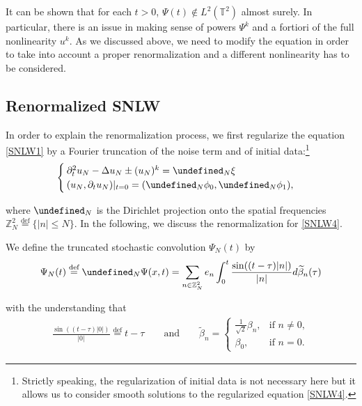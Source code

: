 \documentclass[letterpaper, 11pt,  reqno]{amsart}
\newcommand{\1}{\hspace{0.5mm}\text{I}\hspace{0.5mm}}
\newcommand{\noi}{\noindent}
\newcommand{\Z}{\mathbb{Z}}
\newcommand{\T}{\mathbb{T}}
\let\P= \undefined
\newcommand{\P}{\mathbf{P}}
\newcommand{\be}{\beta}
\newcommand{\Dl}{\Delta}
\newcommand{\wt}{\widetilde}
\newcommand{\dt}{\partial_t}
\numberwithin{equation}{section}
\numberwithin{theorem}{section}
\begin{document}
\noi
It can be shown that for each $t> 0$, $\Psi (t)\notin L^2(\T^2)$ almost surely.
In particular, there is an issue in making sense of powers
$\Psi^k$ and a fortiori of the full nonlinearity $u^k$. 
As we discussed above, 
we need to modify  the equation in order to take into account a proper renormalization and a different nonlinearity has to be considered. 




\subsection{Renormalized SNLW}
In order to explain the renormalization process,
 we first regularize the equation \eqref{SNLW1} by a Fourier truncation of the noise term and of initial data:\footnote{Strictly speaking, the regularization of initial data is not necessary here but it allows
 us to consider smooth solutions to the regularized equation \eqref{SNLW4}.}
\begin{align}
\begin{cases}
\dt^2 u_N -  \Dl  u_N   \pm  ( u_N)^k   = \P_N \xi \\ 
(u_N, \dt u_N) |_{t = 0} = (\P_N\phi_0, \P_N\phi_1),
\end{cases}
\label{SNLW4}
\end{align}


\noi
where  $\P_N$ is the Dirichlet projection onto the spatial frequencies $\Z^2_N \stackrel{\text{def}}{=} \{|n|\leq N\}$.
In the following, we discuss the renormalization for   \eqref{SNLW4}.

We define 
 the truncated stochastic convolution $\Psi_N(t)$ by 
\begin{align} 
\Psi_N(t) \stackrel{\text{def}}{=}  \P_N \Psi(x, t)
 = \sum_{n \in \mathbb{Z}^2_N} e_n 
   \int_0^t \frac{\sin ((t - \tau) | n |)}{| n |} d \wt \beta_n (\tau) 
\label{G0}
\end{align}   


\noi
with the understanding that
\begin{align}
\frac{\sin ((t - \tau) | 0 |)}{| 0 |} \stackrel{\text{def}}{=} t-\tau
\qquad \text{and}\qquad
 \wt \be_n = \begin{cases}
\frac{1}{\sqrt{2}}\be_n, & \text{if }n \ne 0, \\
\be_0, & \text{if } n = 0.
\end{cases}
\label{G0a}
\end{align}
\end{document}
